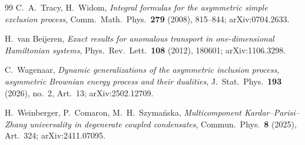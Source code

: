 \begin{thebibliography}{99}
 C.~A.~Tracy, H.~Widom, \emph{Integral formulas for the asymmetric simple
exclusion process}, Comm.~Math.~Phys.~\textbf{279} (2008), 815--844; arXiv:0704.2633.

 H.~van Beijeren, \emph{Exact results for anomalous transport
in one-dimensional Hamiltonian systems}, Phys.~Rev.~Lett.~\textbf{108} (2012),
180601; arXiv:1106.3298.

 C.~Wagenaar, \emph{Dynamic generalizations of the asymmetric
inclusion process, asymmetric Brownian energy process and their dualities},
J.~Stat.~Phys.~\textbf{193} (2026), no.~2, Art.~13; arXiv:2502.12709.

 H.~Weinberger, P.~Comaron, M.~H.~Szyma\'nska, \emph{Multicomponent
Kardar--Parisi--Zhang universality in degenerate coupled condensates},
Commun.~Phys.~\textbf{8} (2025), Art.~324; arXiv:2411.07095.

\end{thebibliography}
